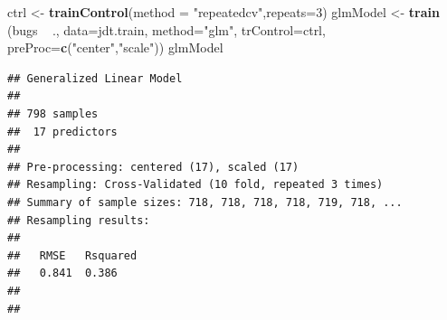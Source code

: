 \documentclass[]{book}
\newenvironment{Shaded}{\begin{snugshade}}{\end{snugshade}}
\newcommand{\KeywordTok}[1]{\textcolor[rgb]{0.13,0.29,0.53}{\textbf{{#1}}}}
\newcommand{\DataTypeTok}[1]{\textcolor[rgb]{0.13,0.29,0.53}{{#1}}}
\newcommand{\DecValTok}[1]{\textcolor[rgb]{0.00,0.00,0.81}{{#1}}}
\newcommand{\StringTok}[1]{\textcolor[rgb]{0.31,0.60,0.02}{{#1}}}
\newcommand{\CommentTok}[1]{\textcolor[rgb]{0.56,0.35,0.01}{\textit{{#1}}}}
\newcommand{\OtherTok}[1]{\textcolor[rgb]{0.56,0.35,0.01}{{#1}}}
\newcommand{\NormalTok}[1]{{#1}}
\begin{document}
\begin{Shaded}
\end{Shaded}

\begin{Shaded}
\begin{Highlighting}[]
\NormalTok{ctrl <-}\StringTok{ }\KeywordTok{trainControl}\NormalTok{(}\DataTypeTok{method =} \StringTok{"repeatedcv"}\NormalTok{,}\DataTypeTok{repeats=}\DecValTok{3}\NormalTok{)}
\NormalTok{glmModel <-}\StringTok{ }\KeywordTok{train} \NormalTok{(bugs ~}\StringTok{ }\NormalTok{., }\DataTypeTok{data=}\NormalTok{jdt.train, }\DataTypeTok{method=}\StringTok{"glm"}\NormalTok{, }\DataTypeTok{trControl=}\NormalTok{ctrl, }\DataTypeTok{preProc=}\KeywordTok{c}\NormalTok{(}\StringTok{"center"}\NormalTok{,}\StringTok{"scale"}\NormalTok{))}
\NormalTok{glmModel}
\end{Highlighting}
\end{Shaded}

\begin{verbatim}
## Generalized Linear Model 
## 
## 798 samples
##  17 predictors
## 
## Pre-processing: centered (17), scaled (17) 
## Resampling: Cross-Validated (10 fold, repeated 3 times) 
## Summary of sample sizes: 718, 718, 718, 718, 719, 718, ... 
## Resampling results:
## 
##   RMSE   Rsquared
##   0.841  0.386   
## 
## 
\end{verbatim}
\end{document}
